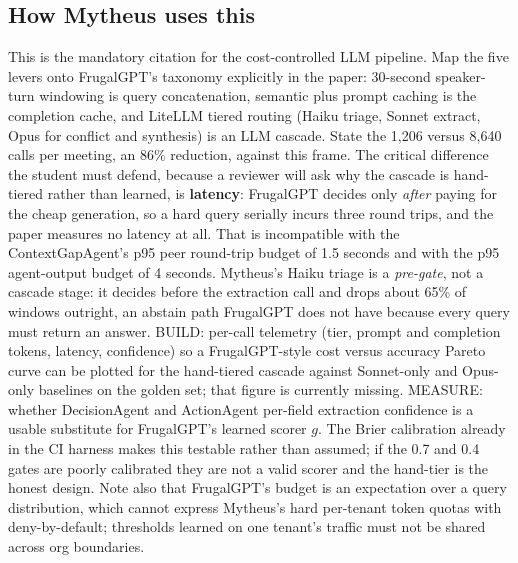 \subsection{How Mytheus uses this}
\begin{takeaway}
This is the mandatory citation for the cost-controlled LLM pipeline. Map the five levers onto FrugalGPT's taxonomy explicitly in the paper: 30-second speaker-turn windowing is query concatenation, semantic plus prompt caching is the completion cache, and LiteLLM tiered routing (Haiku triage, Sonnet extract, Opus for conflict and synthesis) is an LLM cascade. State the 1,206 versus 8,640 calls per meeting, an 86\% reduction, against this frame. The critical difference the student must defend, because a reviewer will ask why the cascade is hand-tiered rather than learned, is \textbf{latency}: FrugalGPT decides only \emph{after} paying for the cheap generation, so a hard query serially incurs three round trips, and the paper measures no latency at all. That is incompatible with the ContextGapAgent's p95 peer round-trip budget of 1.5 seconds and with the p95 agent-output budget of 4 seconds. Mytheus's Haiku triage is a \emph{pre-gate}, not a cascade stage: it decides before the extraction call and drops about 65\% of windows outright, an abstain path FrugalGPT does not have because every query must return an answer. BUILD: per-call telemetry (tier, prompt and completion tokens, latency, confidence) so a FrugalGPT-style cost versus accuracy Pareto curve can be plotted for the hand-tiered cascade against Sonnet-only and Opus-only baselines on the golden set; that figure is currently missing. MEASURE: whether DecisionAgent and ActionAgent per-field extraction confidence is a usable substitute for FrugalGPT's learned scorer $g$. The Brier calibration already in the CI harness makes this testable rather than assumed; if the 0.7 and 0.4 gates are poorly calibrated they are not a valid scorer and the hand-tier is the honest design. Note also that FrugalGPT's budget is an expectation over a query distribution, which cannot express Mytheus's hard per-tenant token quotas with deny-by-default; thresholds learned on one tenant's traffic must not be shared across org boundaries.
\end{takeaway}

